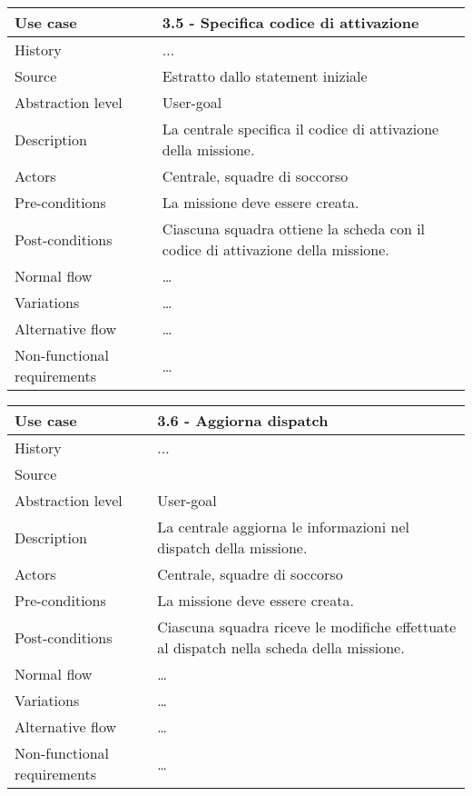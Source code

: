 \documentclass{article}
\begin{document}
    \begin{table}
        \begin{tabularx}{\textwidth}{l|X}
            Use case & 3.5 - Specifica codice di attivazione \\
            \hline
            History & ...                                     \\
            Source & Estratto dallo statement iniziale \\
            Abstraction level & User-goal \\
            Description & La centrale specifica il codice di attivazione della missione. \\
            Actors & Centrale, squadre di soccorso \\
            Pre-conditions & La missione deve essere creata. \\
            Post-conditions & Ciascuna squadra ottiene la scheda con il codice di attivazione della missione. \\
            Normal flow & \dots \\
            Variations & \dots \\
            Alternative flow & \dots \\
            Non-functional requirements & \dots
        \end{tabularx}
        \label{tab:usecase3.5}
    \end{table}

    \begin{table}
        \begin{tabularx}{\textwidth}{l|X}
            Use case & 3.6 - Aggiorna dispatch \\
            \hline
            History & ...                                     \\
            Source &  \\
            Abstraction level & User-goal \\
            Description & La centrale aggiorna le informazioni nel dispatch della missione. \\
            Actors & Centrale, squadre di soccorso \\
            Pre-conditions & La missione deve essere creata. \\
            Post-conditions & Ciascuna squadra riceve le modifiche effettuate al dispatch nella scheda della missione. \\
            Normal flow & \dots \\
            Variations & \dots \\
            Alternative flow & \dots \\
            Non-functional requirements & \dots
        \end{tabularx}
        \label{tab:usecase3.6}
    \end{table}
\end{document}

